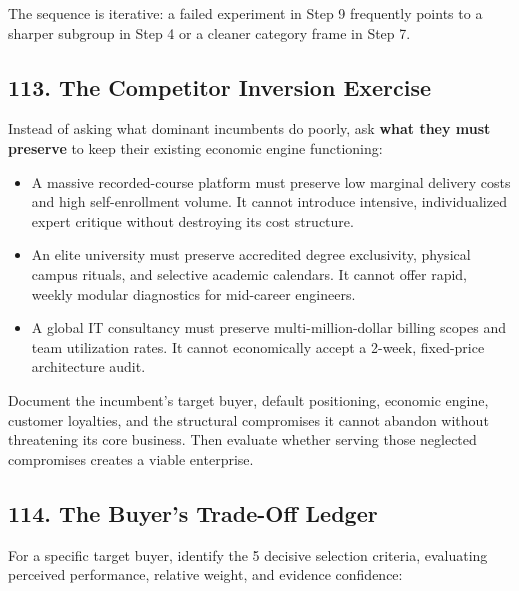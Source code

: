 The sequence is iterative: a failed experiment in Step 9 frequently points to a sharper subgroup in Step 4 or a cleaner category frame in Step 7.

\subsection*{113. The Competitor Inversion Exercise}

Instead of asking what dominant incumbents do poorly, ask \textbf{what they must preserve} to keep their existing economic engine functioning:

\begin{itemize}
    \item A massive recorded-course platform must preserve low marginal delivery costs and high self-enrollment volume. It cannot introduce intensive, individualized expert critique without destroying its cost structure.
    \item An elite university must preserve accredited degree exclusivity, physical campus rituals, and selective academic calendars. It cannot offer rapid, weekly modular diagnostics for mid-career engineers.
    \item A global IT consultancy must preserve multi-million-dollar billing scopes and team utilization rates. It cannot economically accept a 2-week, fixed-price architecture audit.
\end{itemize}

Document the incumbent's target buyer, default positioning, economic engine, customer loyalties, and the structural compromises it cannot abandon without threatening its core business. Then evaluate whether serving those neglected compromises creates a viable enterprise.

\subsection*{114. The Buyer's Trade-Off Ledger}

For a specific target buyer, identify the 5 decisive selection criteria, evaluating perceived performance, relative weight, and evidence confidence:

